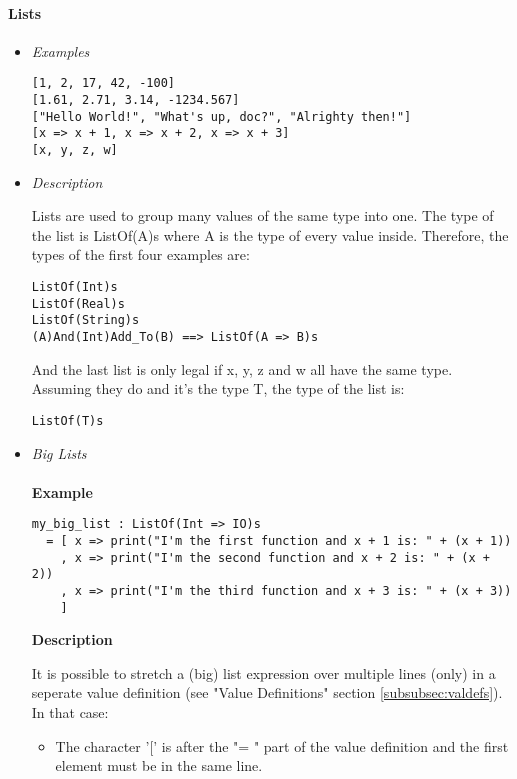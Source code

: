 \documentclass{article}
\begin{document}
\paragraph{Lists}

\begin{itemize}

\item \textit{Examples}
\begin{verbatim}
[1, 2, 17, 42, -100]
[1.61, 2.71, 3.14, -1234.567]
["Hello World!", "What's up, doc?", "Alrighty then!"]
[x => x + 1, x => x + 2, x => x + 3]
[x, y, z, w]
\end{verbatim}

\item \textit{Description}

Lists are used to group many values of the same type into one. 
The type of the list is ListOf(A)s where A is the type of every value inside.
Therefore, the types of the first four examples are:
\begin{verbatim}
ListOf(Int)s
ListOf(Real)s
ListOf(String)s
(A)And(Int)Add_To(B) ==> ListOf(A => B)s
\end{verbatim}
And the last list is only legal if x, y, z and w all have the same type. Assuming 
they do and it's the type T, the type of the list is: 
\begin{verbatim}
ListOf(T)s
\end{verbatim}

\item \textit{Big Lists}
  \\\\
  \textbf{Example}

  \begin{verbatim}
my_big_list : ListOf(Int => IO)s
  = [ x => print("I'm the first function and x + 1 is: " + (x + 1))
    , x => print("I'm the second function and x + 2 is: " + (x + 2))
    , x => print("I'm the third function and x + 3 is: " + (x + 3))
    ]
  \end{verbatim}

  \textbf{Description} 

  It is possible to stretch a (big) list expression over multiple lines (only) in
  a seperate value definition (see "Value Definitions" section
  \ref{subsubsec:valdefs}).  In that case:
  \begin{itemize}
  \item
  The character '[' is after the "= " part of the value definition
  and the first element must be in the same line.


\end{itemize}
\end{itemize}
\end{document}
